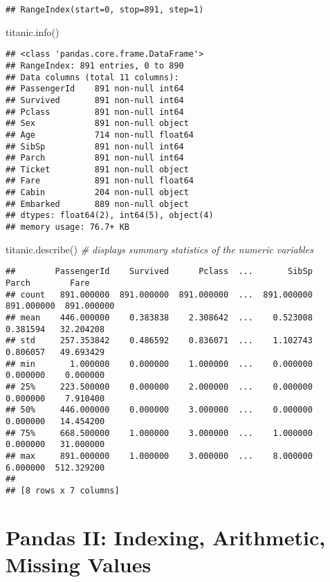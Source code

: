 \documentclass[
]{book}
\newenvironment{Shaded}{\begin{snugshade}}{\end{snugshade}}
\newcommand{\CommentTok}[1]{\textcolor[rgb]{0.56,0.35,0.01}{\textit{#1}}}
\newcommand{\NormalTok}[1]{#1}
\begin{document}
\begin{verbatim}
## RangeIndex(start=0, stop=891, step=1)
\end{verbatim}

\begin{Shaded}
\begin{Highlighting}[]
\NormalTok{titanic.info()}
\end{Highlighting}
\end{Shaded}

\begin{verbatim}
## <class 'pandas.core.frame.DataFrame'>
## RangeIndex: 891 entries, 0 to 890
## Data columns (total 11 columns):
## PassengerId    891 non-null int64
## Survived       891 non-null int64
## Pclass         891 non-null int64
## Sex            891 non-null object
## Age            714 non-null float64
## SibSp          891 non-null int64
## Parch          891 non-null int64
## Ticket         891 non-null object
## Fare           891 non-null float64
## Cabin          204 non-null object
## Embarked       889 non-null object
## dtypes: float64(2), int64(5), object(4)
## memory usage: 76.7+ KB
\end{verbatim}

\begin{Shaded}
\begin{Highlighting}[]
\NormalTok{titanic.describe() }\CommentTok{\# displays summary statistics of the numeric variables}
\end{Highlighting}
\end{Shaded}

\begin{verbatim}
##        PassengerId    Survived      Pclass  ...       SibSp       Parch        Fare
## count   891.000000  891.000000  891.000000  ...  891.000000  891.000000  891.000000
## mean    446.000000    0.383838    2.308642  ...    0.523008    0.381594   32.204208
## std     257.353842    0.486592    0.836071  ...    1.102743    0.806057   49.693429
## min       1.000000    0.000000    1.000000  ...    0.000000    0.000000    0.000000
## 25%     223.500000    0.000000    2.000000  ...    0.000000    0.000000    7.910400
## 50%     446.000000    0.000000    3.000000  ...    0.000000    0.000000   14.454200
## 75%     668.500000    1.000000    3.000000  ...    1.000000    0.000000   31.000000
## max     891.000000    1.000000    3.000000  ...    8.000000    6.000000  512.329200
## 
## [8 rows x 7 columns]
\end{verbatim}

\hypertarget{pandas-ii-indexing-arithmetic-missing-values}{%
\section{Pandas II: Indexing, Arithmetic, Missing Values}\label{pandas-ii-indexing-arithmetic-missing-values}}
\end{document}
